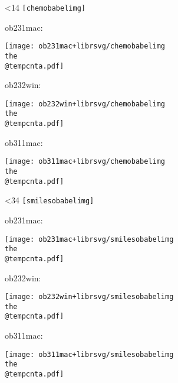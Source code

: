 \documentclass{article}
\begin{document}
\centering

\makeatletter
{}
\loop\ifnum\@tempcnta<14\relax
  \advance\@tempcnta\@ne
  \texttt{[chemobabelimg\the\@tempcnta]}\par
  ob231mac:\par
  \texttt{[image: ob231mac+librsvg/chemobabelimg\\the\\@tempcnta.pdf]}\par
  ob232win:\par
  \texttt{[image: ob232win+librsvg/chemobabelimg\\the\\@tempcnta.pdf]}\par
  ob311mac:\par
  \texttt{[image: ob311mac+librsvg/chemobabelimg\\the\\@tempcnta.pdf]}\par
  \newpage
\repeat
{}
\loop\ifnum\@tempcnta<34\relax
  \advance\@tempcnta\@ne
  \texttt{[smilesobabelimg\the\@tempcnta]}\par
  ob231mac:\par
  \texttt{[image: ob231mac+librsvg/smilesobabelimg\\the\\@tempcnta.pdf]}\par
  ob232win:\par
  \texttt{[image: ob232win+librsvg/smilesobabelimg\\the\\@tempcnta.pdf]}\par
  ob311mac:\par
  \texttt{[image: ob311mac+librsvg/smilesobabelimg\\the\\@tempcnta.pdf]}\par
  \newpage
\repeat
\makeatother
\end{document}
